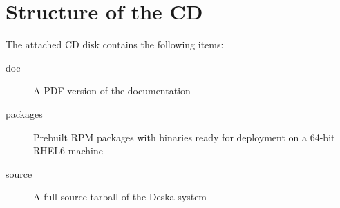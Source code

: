 \documentclass[deska]{subfiles}
\begin{document}
\chapter{Structure of the CD}
\label{sec:cd-structure}

The attached CD disk contains the following items:

\begin{description}
    \item[doc] A PDF version of the documentation
    \item[packages] Prebuilt RPM packages with binaries ready for deployment on a 64-bit RHEL6 machine
    \item[source] A full source tarball of the Deska system
\end{description}
\end{document}
